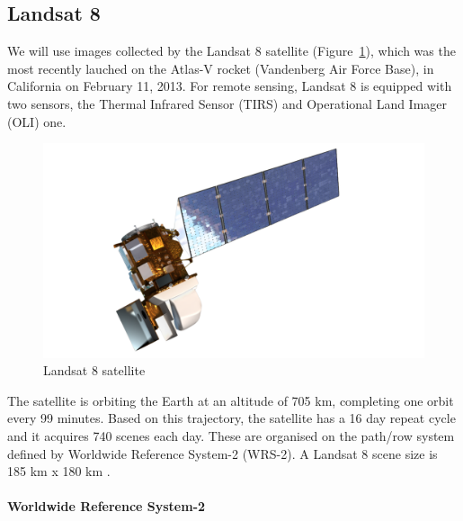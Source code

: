 \documentclass[12pt, a4paper]{report}
\begin{document}
	\subsection{Landsat 8}
	\label{seq:landsat8_section}

	\par We will use images collected by the Landsat 8 satellite (Figure~\ref{fig:landsat_satellite}), which was the most recently lauched on the Atlas-V rocket (Vandenberg Air Force Base), in California on February 11, 2013. For remote sensing, Landsat 8 is equipped with two sensors, the Thermal Infrared Sensor (TIRS)  and Operational Land Imager (OLI) one.
	\begin{figure}[h!]
		\centering
		\includegraphics[scale=0.25]{../images/LandsatSatellite.png}
		\caption{Landsat 8 satellite \cite{LANDSATPIC}}
		\label{fig:landsat_satellite}
	\end{figure}

	\par The satellite is orbiting the Earth at an altitude of 705 km, completing one orbit every 99 minutes. Based on this trajectory, the satellite has a 16 day repeat cycle and it acquires 740 scenes each day. These are organised on the path/row system defined by Worldwide Reference System-2 (WRS-2). A Landsat 8 scene size is 185 km x 180 km \cite{LANDSAT}. 
	
	\paragraph{Worldwide Reference System-2}
	\label{par:wrs2}
	
\end{document}
